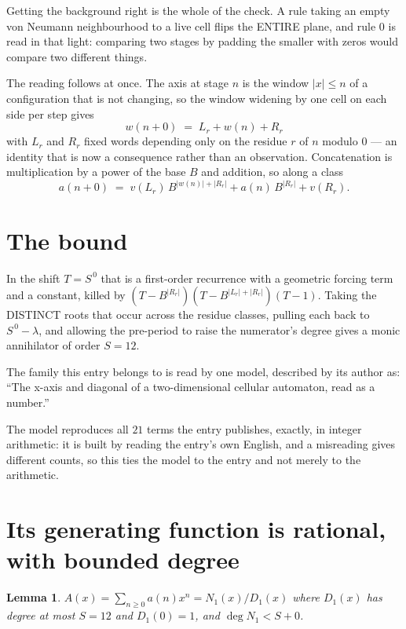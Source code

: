 \documentclass[11pt,a4paper]{article}
\theoremstyle{plain}
\newtheorem{lemma}[theorem]{Lemma}
\theoremstyle{definition}
\begin{document}
Getting the background right is the whole of the check. A rule taking an empty von Neumann
neighbourhood to a live cell flips the ENTIRE plane, and rule 0 is read
in that light: comparing two stages by padding the smaller with zeros would compare two
different things.

The reading follows at once. The axis at stage $n$ is the window $|x|\le n$ of a configuration
that is not changing, so the window widening by one cell on each side per step gives
\[
w(n+0)\;=\;L_r + w(n) + R_r
\]
with $L_r$ and $R_r$ fixed words depending only on the residue $r$ of $n$ modulo $0$ --- an
identity that is now a consequence rather than an observation. Concatenation is multiplication
by a power of the base $B$ and addition, so along a class
\[
a(n+0)\;=\;v(L_r)\,B^{|w(n)|+|R_r|} + a(n)\,B^{|R_r|} + v(R_r).
\]

\section{The bound}

In the shift $T=S^{\,0}$ that is a first-order recurrence with a geometric forcing term and a
constant, killed by $(T-B^{|R_r|})(T-B^{|L_r|+|R_r|})(T-1)$. Taking the DISTINCT roots that
occur across the residue classes, pulling each back to $S^{\,0}-\lambda$, and allowing the
pre-period to raise the numerator's degree gives a monic annihilator of order $S=12$.

The family this entry belongs to is read by one model, described by its author as: ``The x-axis and diagonal of a two-dimensional cellular automaton, read as a number.''


The model reproduces all $21$ terms the entry publishes, exactly, in integer arithmetic:
it is built by reading the entry's own English, and a misreading gives different counts, so
this ties the model to the entry and not merely to the arithmetic.

\section{Its generating function is rational, with bounded degree}

\begin{lemma}\label{lem:rat}
$A(x)=\sum_{n\ge0}a(n)x^n=N_1(x)/D_1(x)$ where $D_1(x)$ has degree at most $S=12$ and
$D_1(0)=1$, and $\deg N_1<S+0$.
\end{lemma}
\end{document}
